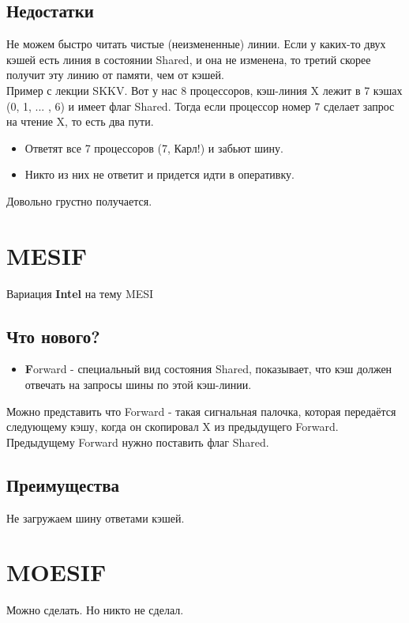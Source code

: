 \documentclass[12pt, a4paper]{article}
\begin{document}
\subsection{Недостатки}
Не можем быстро читать чистые (неизмененные) линии. Если у каких-то двух кэшей есть линия в состоянии Shared, и она не изменена, то третий скорее получит эту линию от памяти, чем от кэшей.\\
Пример с лекции SKKV. Вот у нас 8 процессоров, кэш-линия X лежит в 7 кэшах (0, 1, ... , 6) и имеет флаг Shared. Тогда если процессор номер 7 сделает запрос на чтение X, то есть два пути.
\begin{itemize}
    \item Ответят все 7 процессоров (7, Карл!) и забьют шину.
    \item Никто из них не ответит и придется идти в оперативку.
\end{itemize}
Довольно грустно получается.
\section{MESIF}
Вариация \textbf{Intel} на тему MESI
\subsection{Что нового?}
\begin{itemize}
    \item \textbf{F}orward - специальный вид состояния Shared, показывает, что кэш должен отвечать на запросы шины по этой кэш-линии.
\end{itemize}
Можно представить что Forward - такая сигнальная палочка, которая передаётся следующему кэшу, когда он скопировал X из предыдущего Forward. Предыдущему Forward нужно поставить флаг Shared.
\subsection{Преимущества}
Не загружаем шину ответами кэшей.
\section{MOESIF}
Можно сделать. Но никто не сделал.
\end{document}
